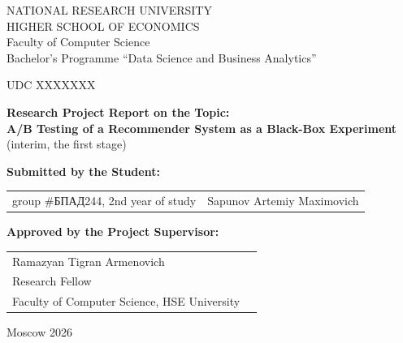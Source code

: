 \begin{titlepage}
\newpage

{
\begin{center}
NATIONAL RESEARCH UNIVERSITY\\
HIGHER SCHOOL OF ECONOMICS
\\
\bigskip
Faculty of Computer Science\\
Bachelor’s Programme “Data Science and Business Analytics”
\end{center}
}

\vspace{2em}
UDC XXXXXXX %
\vspace{4em}

\begin{center}
{\bf Research Project Report on the Topic:}\\
{\bf A/B Testing of a Recommender System as a Black-Box Experiment}\\
(interim, the first stage)
\end{center}

\vspace{2em}

{\bf Submitted by the Student: \vspace{2mm}}

{
\begin{tabular}{l@{\hskip 1.5cm}l}
group \#\foreignlanguage{russian}{БПАД}244, 2nd year of study & 
Sapunov Artemiy Maximovich \\
\end{tabular}}


\vspace{1em}
{\bf Approved by the Project Supervisor: \vspace{2mm}}

{
\begin{tabular}{l@{\hskip 1.5cm}l}
Ramazyan Tigran Armenovich\\
Research Fellow\\
Faculty of Computer Science, HSE University 
\end{tabular}}

\vspace{\fill}

\begin{center}
Moscow 2026
\end{center}

\end{titlepage}